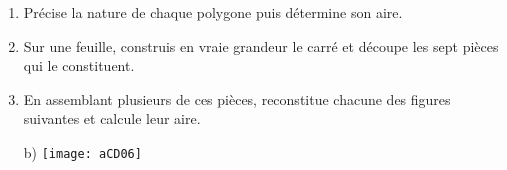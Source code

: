 \begin{activite}[Découpages]
\begin{enumerate}
    \item  Précise la nature de chaque polygone puis détermine son aire.
    \item Sur une feuille, construis en vraie grandeur le carré et découpe les sept pièces qui le constituent.
    \item En assemblant plusieurs de ces pièces, reconstitue chacune des figures suivantes et calcule leur aire.
    
    \vspace{1em}
    
                {b)
                \texttt{[image: aCD06]}}
    
\end{enumerate}

\end{activite}